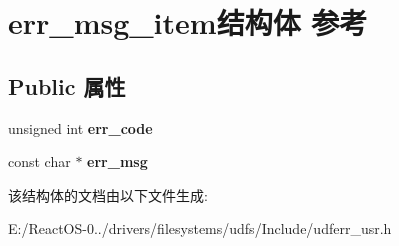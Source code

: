 \hypertarget{structerr__msg__item}{}\section{err\+\_\+msg\+\_\+item结构体 参考}
\label{structerr__msg__item}
\subsection*{Public 属性}
\begin{DoxyCompactItemize}
\item 
\mbox{\label{structerr__msg__item_acd411145dd97eec33e625258b3fa2ecf}} 
unsigned int {\bfseries err\+\_\+code}
\item 
\mbox{\label{structerr__msg__item_a7832610a6a5af8dabda8ec2a16dc3812}} 
const char $\ast$ {\bfseries err\+\_\+msg}
\end{DoxyCompactItemize}


该结构体的文档由以下文件生成\+:\begin{DoxyCompactItemize}
\item 
E\+:/\+React\+O\+S-\/0../drivers/filesystems/udfs/\+Include/udferr\+\_\+usr.\+h\end{DoxyCompactItemize}

